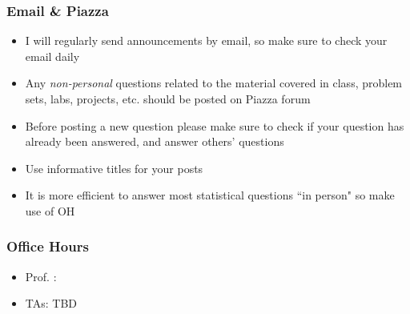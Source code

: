\documentclass[slidestop,compress,mathserif,12pt,t,professionalfonts,xcolor=table]{beamer}
\begin{document}
\begin{frame}
\frametitle{Email \& Piazza}

\begin{itemize}

\item I will regularly send announcements by email, so make sure to check your email  daily

\item Any \emph{non-personal} questions related to the material covered in class, problem sets, labs, projects, etc. should be posted on Piazza forum

\item Before posting a new question please make sure to check if your question has already been answered, and answer others' questions

\item Use informative titles for your posts

\item It is more efficient to answer most statistical questions ``in person" so make use of OH

\end{itemize}


\end{frame}


\begin{frame}
\frametitle{Office Hours}

\begin{itemize}
\item Prof. \LastName{}: \OfficeHours{}
\item TAs: TBD
\end{itemize}

\end{frame}

\end{document}
